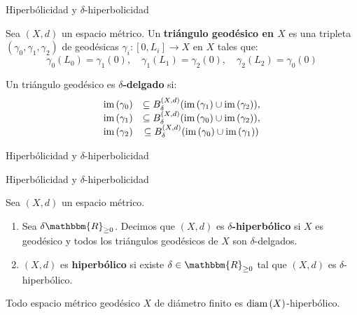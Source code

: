 \documentclass[xcolor=dvipsnames]{beamer}
\theoremstyle{largebreak}
\newcommand\cf[3]{\ensuremath{#1:#2\rightarrow#3}}
\newcommand{\bbm}[1]{\ensuremath{\mathbbm{#1}}}
\newcommand{\im}[1]{\ensuremath{\textup{im}\left(#1\right)}}
\newcommand{\Diam}[1]{\ensuremath{\textup{diam}\left(#1\right)}}
\begin{document}
\begin{frame}{Hiperbólicidad y $\delta$-hiperbolicidad}
    \begin{mydef}
        Sea $(X,d)$ un espacio métrico. Un \textbf{triángulo geodésico en $X$} es una tripleta $(\gamma_0,\gamma_1,\gamma_2)$ de geodésicas $\cf{\gamma_i}{[0,L_i]}{X}$ en $X$ tales que:
        \begin{equation*}
            \gamma_0(L_0)=\gamma_1(0),\quad \gamma_1(L_1)=\gamma_2(0),\quad \gamma_2(L_2)=\gamma_0(0)
        \end{equation*}
    \end{mydef}

    \begin{mydef}
        Un triángulo geodésico es \textbf{$\delta$-delgado} si:
        \begin{equation*}
            \begin{array}{cc}
                \im{\gamma_0}&\subseteq B_{\delta}^{(X,d)}(\im{\gamma_1}\cup\im{\gamma_2}),\\
                \im{\gamma_1}&\subseteq B_{\delta}^{(X,d)}(\im{\gamma_0}\cup\im{\gamma_2}),\\
                \im{\gamma_2}&\subseteq B_{\delta}^{(X,d)}(\im{\gamma_0}\cup\im{\gamma_1})
            \end{array}
        \end{equation*}
    \end{mydef}
\end{frame}

\begin{frame}{Hiperbólicidad y $\delta$-hiperbolicidad}
    \begin{exa}
    \end{exa}
\end{frame}

\begin{frame}{Hiperbólicidad y $\delta$-hiperbolicidad}
    \begin{mydef}
        Sea $(X,d)$ un espacio métrico.
        \begin{enumerate}[label = \textit{(\arabic*)}]
            \item Sea $\delta\bbm{R}_{\geq0}$. Decimos que $(X,d)$ es \textbf{$\delta$-hiperbólico} si $X$ es geodésico y todos los triángulos geodésicos de $X$ son $\delta$-delgados.
            \item $(X,d)$ es \textbf{hiperbólico} si existe $\delta\in\bbm{R}_{\geq0}$ tal que $(X,d)$ es $\delta$-hiperbólico.
        \end{enumerate}
    \end{mydef}

    \begin{exa}
        Todo espacio métrico geodésico $X$ de diámetro finito es $\Diam{X}$-hiperbólico. 
    \end{exa}
\end{frame}
\end{document}
